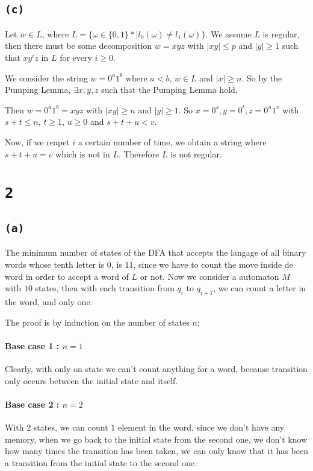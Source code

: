 \documentclass[a4paper,11pt]{report}
\begin{document}
\subsection*{\texttt{(c)}}

Let $w \in L$, where  $L = \{\omega \in \{0,1\}* | l_0(\omega) \neq l_1
(\omega)\}$. We assume $L$ is regular, then there must be some decomposition $w
= xyz$ with $|xy| \leq p$ and $|y| \geq 1$ such that $xy^iz$ in $L$ for every $i
\geq 0$.

We consider the string $w = 0^a1^b$ where $a < b$, $w \in L$ and $|x| \geq n$.
So by the Pumping Lemma, $\exists x,y,z$ such that the Pumping Lemma hold.


Then $w = 0^a1^b = xyz$ with $|xy| \geq n$ and $|y| \geq 1$. So $x = 0^s, y =
0^t, z = 0^u1^v$ with $s+t \leq n$, $t \geq 1$, $u \geq 0$ and $s + t + u < v$.

Now, if we reapet $i$ a certain number of time, we obtain a string where $s + t
+ u = v$ which is not in $L$. Therefore $L$ is not regular.


\section*{\texttt{2}}

\subsection*{\texttt{(a)}}

The minimum number of states of the DFA that accepts the langage of all binary
words whose tenth letter is 0, is $11$, since we have to count the move inside
de word in order to accept a word of $L$ or not. Now we consider a automaton $M$
with $10$ states, then with each transition from $q_i$ to $q_{i+1}$, we can
count a letter in the word, and only one.

The proof is by induction on the number of states $n$:
\paragraph{Base case 1 : $n = 1$} Clearly, with only on state we can't count
anything for a word, because transition only occurs between the initial state
and itself.
\paragraph{Base case 2 : $n = 2$} With $2$ states, we can count $1$ element in
the word, since we don't have any memory, when we go back to the initial state
from the second one, we don't know how many times the transition has been taken,
we can only know that it has been a transition from the initial state to the
second one.
\end{document}
